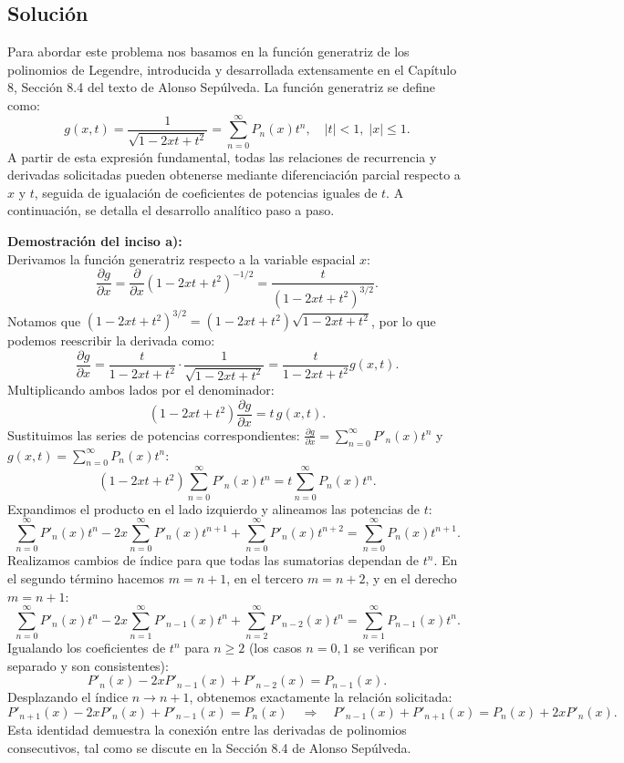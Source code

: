 \documentclass[a4paper]{article}
\begin{document}
\subsection{Solución}
Para abordar este problema nos basamos en la función generatriz de los polinomios de Legendre, introducida y desarrollada extensamente en el Capítulo 8, Sección 8.4 del texto de Alonso Sepúlveda. La función generatriz se define como:
$$
g(x,t) = \frac{1}{\sqrt{1 - 2xt + t^2}} = \sum_{n=0}^{\infty} P_n(x) t^n, \quad |t| < 1, \; |x| \leq 1.
$$
A partir de esta expresión fundamental, todas las relaciones de recurrencia y derivadas solicitadas pueden obtenerse mediante diferenciación parcial respecto a $x$ y $t$, seguida de igualación de coeficientes de potencias iguales de $t$. A continuación, se detalla el desarrollo analítico paso a paso.

\vspace{0.3cm}
\noindent\textbf{Demostración del inciso a):} \\
Derivamos la función generatriz respecto a la variable espacial $x$:
$$
\frac{\partial g}{\partial x} = \frac{\partial}{\partial x} \left(1 - 2xt + t^2\right)^{-1/2} = \frac{t}{\left(1 - 2xt + t^2\right)^{3/2}}.
$$
Notamos que $\left(1 - 2xt + t^2\right)^{3/2} = \left(1 - 2xt + t^2\right) \sqrt{1 - 2xt + t^2}$, por lo que podemos reescribir la derivada como:
$$
\frac{\partial g}{\partial x} = \frac{t}{1 - 2xt + t^2} \cdot \frac{1}{\sqrt{1 - 2xt + t^2}} = \frac{t}{1 - 2xt + t^2} g(x,t).
$$
Multiplicando ambos lados por el denominador:
$$
(1 - 2xt + t^2) \frac{\partial g}{\partial x} = t \, g(x,t).
$$
Sustituimos las series de potencias correspondientes: $\frac{\partial g}{\partial x} = \sum_{n=0}^{\infty} P'_n(x) t^n$ y $g(x,t) = \sum_{n=0}^{\infty} P_n(x) t^n$:
$$
(1 - 2xt + t^2) \sum_{n=0}^{\infty} P'_n(x) t^n = t \sum_{n=0}^{\infty} P_n(x) t^n.
$$
Expandimos el producto en el lado izquierdo y alineamos las potencias de $t$:
$$
\sum_{n=0}^{\infty} P'_n(x) t^n - 2x \sum_{n=0}^{\infty} P'_n(x) t^{n+1} + \sum_{n=0}^{\infty} P'_n(x) t^{n+2} = \sum_{n=0}^{\infty} P_n(x) t^{n+1}.
$$
Realizamos cambios de índice para que todas las sumatorias dependan de $t^n$. En el segundo término hacemos $m = n+1$, en el tercero $m = n+2$, y en el derecho $m = n+1$:
$$
\sum_{n=0}^{\infty} P'_n(x) t^n - 2x \sum_{n=1}^{\infty} P'_{n-1}(x) t^n + \sum_{n=2}^{\infty} P'_{n-2}(x) t^n = \sum_{n=1}^{\infty} P_{n-1}(x) t^n.
$$
Igualando los coeficientes de $t^n$ para $n \geq 2$ (los casos $n=0,1$ se verifican por separado y son consistentes):
$$
P'_n(x) - 2x P'_{n-1}(x) + P'_{n-2}(x) = P_{n-1}(x).
$$
Desplazando el índice $n \to n+1$, obtenemos exactamente la relación solicitada:
$$
P'_{n+1}(x) - 2x P'_n(x) + P'_{n-1}(x) = P_n(x) \quad \Rightarrow \quad P'_{n-1}(x) + P'_{n+1}(x) = P_n(x) + 2x P'_n(x).
$$
Esta identidad demuestra la conexión entre las derivadas de polinomios consecutivos, tal como se discute en la Sección 8.4 de Alonso Sepúlveda.
\end{document}
